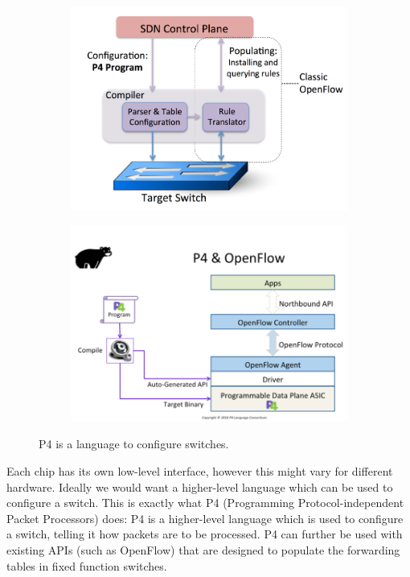 \documentclass[11pt,oneside,a4paper]{article}
\begin{document}
\newpage

\begin{figure}%
	\centering
	\begin{subfigure}[t]{.5\textwidth}
		\centering
		\includegraphics[width=\linewidth]{figures/P4_overview}
		\label{fig:P4_overview}
	\end{subfigure}%
	\begin{subfigure}[t]{.5\textwidth}
		\centering
		\includegraphics[width=\linewidth]{figures/P4_openflow}
		\label{fig:P4_openflow}
	\end{subfigure}
	\caption{P4 is a language to configure switches. \cite{bosshart2014p4}}
\end{figure}


Each chip has its own low-level interface, however this might vary for different hardware. Ideally we would want a higher-level language which can be used to configure a switch. This is exactly what P4 (Programming Protocol-independent Packet Processors) does: P4 is a higher-level language which is used to configure a switch, telling it how packets are to be processed. P4 can further be used with existing APIs (such as OpenFlow) that are designed to populate the forwarding tables in fixed function switches.
\end{document}

